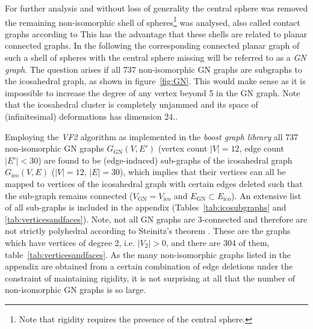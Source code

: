 For further analysis and without loss of generality the central sphere was
removed the remaining non-isomorphic shell of spheres\footnote{Note that
rigidity requires the presence of the central sphere.} was analysed, also called
contact graphs according to
\citeauthor{Schuette_AufwelcherKugel_1951}\autocite{Schuette_AufwelcherKugel_1951}
This has the advantage that these shells are related to planar connected graphs.
In the following the corresponding connected planar graph of such a shell of
spheres with the central sphere missing will be referred to as a \textit{GN
graph}. The question arises if all 737 non-isomorphic GN graphs are subgraphs to
the icosahedral graph, as shown in figure~\ref{fig:GN}. This would make sense as
it is impossible to increase the degree of any vertex beyond 5 in the GN graph.
Note that the icosahedral cluster is completely unjammed and its space of
(infinitesimal) deformations has dimension
24.\autocite{Kusner_ConfigurationSpacesEqual_2018}.

Employing the \textit{VF2} algorithm
\autocite{Cordella_SubGraphIsomorphism_2004} as implemented in the \textit{boost
graph library} \autocite{Siek_BoostGraphLibrary_2002} all 737 non-isomorphic
\ac{GN} graphs $G_\mathrm{GN}(V,E')$ (vertex count $|V|=12$, edge count
$|E'|<30$) are found to be (edge-induced) sub-graphs of the icosahedral graph
$G_\mathrm{ico}(V,E)$ ($|V|=12$, $|E|=30$), which implies that their vertices
can all be mapped to vertices of the icosahedral graph with certain edges
deleted such that the sub-graph remains connected ($V_\mathrm{GN} =
V_\mathrm{ico}$ and $E_\mathrm{GN}\subset E_\mathrm{ico}$). An extensive list of
all sub-graphs is included in the appendix (Tables~\ref{tab:icosubgraphs} and
\ref{tab:verticesandfaces}). Note, not all GN graphs are 3-connected and
therefore are not strictly polyhedral according to Steinitz's theorem
\autocite{Steinitz_PolyederundRaumeinteilungen_1916}. These are the graphs which
have vertices of degree 2, i.e. $|V_2|>0$, and there are 304 of them,
table~\ref{tab:verticesandfaces}. As the many non-isomorphic graphs listed in
the appendix are obtained from a certain combination of edge deletions under the
constraint of maintaining rigidity, it is not surprising at all that the number
of non-isomorphic \ac{GN} graphs is so large.

